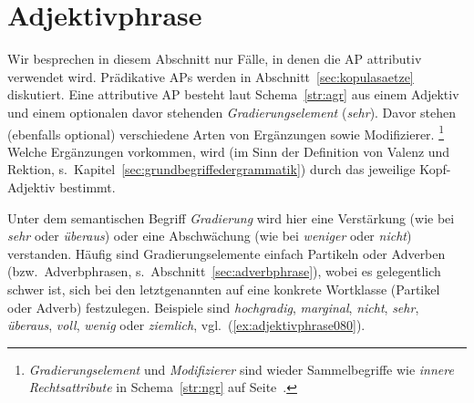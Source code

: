 \section{Adjektivphrase}
\label{sec:adjektivphrase}

Wir besprechen in diesem Abschnitt nur Fälle, in denen die AP attributiv verwendet wird.
Prädikative APs werden in Abschnitt~\ref{sec:kopulasaetze} diskutiert.
Eine attributive AP besteht laut Schema~\ref{str:agr} aus einem Adjektiv und einem optionalen davor stehenden \textit{Gradierungselement} (\zB \textit{sehr}).
Davor stehen (ebenfalls optional) verschiedene Arten von Ergänzungen sowie Modifizierer.%
\footnote{\textit{Gradierungselement} und \textit{Modifizierer} sind wieder Sammelbegriffe wie \textit{innere Rechtsattribute} in Schema~\ref{str:ngr} auf Seite~\pageref{str:ngr}.}
Welche Ergänzungen vorkommen, wird (im Sinn der Definition von Valenz und Rektion, s.\ Kapitel~\ref{sec:grundbegriffedergrammatik}) durch das jeweilige Kopf-Adjektiv bestimmt.



Unter dem semantischen Begriff \textit{Gradierung} wird hier eine Verstärkung (wie bei \textit{sehr} oder \textit{überaus}) oder eine Abschwächung (wie bei \textit{weniger} oder \textit{nicht}) verstanden.
Häufig sind Gradierungselemente einfach Partikeln oder Adverben (bzw.\ Adverbphrasen, s.\ Abschnitt~\ref{sec:adverbphrase}), wobei es gelegentlich schwer ist, sich bei den letztgenannten auf eine konkrete Wortklasse (Partikel oder Adverb) festzulegen.
Beispiele sind \textit{hochgradig}, \textit{marginal}, \textit{nicht}, \textit{sehr}, \textit{überaus}, \textit{voll}, \textit{wenig} oder \textit{ziemlich}, vgl.\ (\ref{ex:adjektivphrase080}).

\Stretch[0.5]

\begin{exe}
  \ex\label{ex:adjektivphrase080}
  \begin{xlist}
  \end{xlist}
\end{exe}

